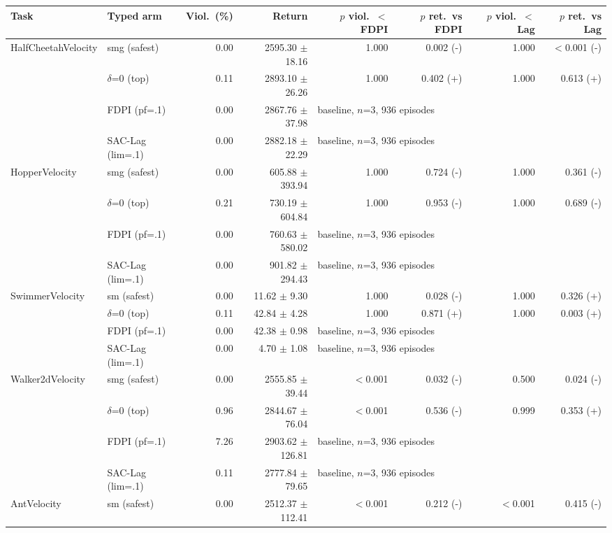 \begin{tabular}{llrrrrrr}
\toprule
Task & Typed arm & Viol.\ (\%) & Return & $p$ viol.\ $<$ FDPI & $p$ ret.\ vs FDPI & $p$ viol.\ $<$ Lag & $p$ ret.\ vs Lag \\
\midrule
HalfCheetahVelocity & smg (safest) & 0.00 & 2595.30 $\pm$ 18.16 & 1.000 & 0.002 (-) & 1.000 & $<$0.001 (-) \\
 & $\delta$=0 (top) & 0.11 & 2893.10 $\pm$ 26.26 & 1.000 & 0.402 (+) & 1.000 & 0.613 (+) \\
 & FDPI (pf=.1) & 0.00 & 2867.76 $\pm$ 37.98 & \multicolumn{4}{l}{baseline, $n$=3, 936 episodes} \\
 & SAC-Lag (lim=.1) & 0.00 & 2882.18 $\pm$ 22.29 & \multicolumn{4}{l}{baseline, $n$=3, 936 episodes} \\
\midrule
HopperVelocity & smg (safest) & 0.00 & 605.88 $\pm$ 393.94 & 1.000 & 0.724 (-) & 1.000 & 0.361 (-) \\
 & $\delta$=0 (top) & 0.21 & 730.19 $\pm$ 604.84 & 1.000 & 0.953 (-) & 1.000 & 0.689 (-) \\
 & FDPI (pf=.1) & 0.00 & 760.63 $\pm$ 580.02 & \multicolumn{4}{l}{baseline, $n$=3, 936 episodes} \\
 & SAC-Lag (lim=.1) & 0.00 & 901.82 $\pm$ 294.43 & \multicolumn{4}{l}{baseline, $n$=3, 936 episodes} \\
\midrule
SwimmerVelocity & sm (safest) & 0.00 & 11.62 $\pm$ 9.30 & 1.000 & 0.028 (-) & 1.000 & 0.326 (+) \\
 & $\delta$=0 (top) & 0.11 & 42.84 $\pm$ 4.28 & 1.000 & 0.871 (+) & 1.000 & 0.003 (+) \\
 & FDPI (pf=.1) & 0.00 & 42.38 $\pm$ 0.98 & \multicolumn{4}{l}{baseline, $n$=3, 936 episodes} \\
 & SAC-Lag (lim=.1) & 0.00 & 4.70 $\pm$ 1.08 & \multicolumn{4}{l}{baseline, $n$=3, 936 episodes} \\
\midrule
Walker2dVelocity & smg (safest) & 0.00 & 2555.85 $\pm$ 39.44 & $<$0.001 & 0.032 (-) & 0.500 & 0.024 (-) \\
 & $\delta$=0 (top) & 0.96 & 2844.67 $\pm$ 76.04 & $<$0.001 & 0.536 (-) & 0.999 & 0.353 (+) \\
 & FDPI (pf=.1) & 7.26 & 2903.62 $\pm$ 126.81 & \multicolumn{4}{l}{baseline, $n$=3, 936 episodes} \\
 & SAC-Lag (lim=.1) & 0.11 & 2777.84 $\pm$ 79.65 & \multicolumn{4}{l}{baseline, $n$=3, 936 episodes} \\
\midrule
AntVelocity & sm (safest) & 0.00 & 2512.37 $\pm$ 112.41 & $<$0.001 & 0.212 (-) & $<$0.001 & 0.415 (-) \\

\end{tabular}
